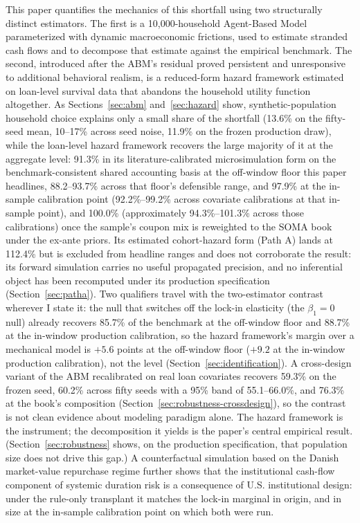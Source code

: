 \documentclass[12pt]{article}
\begin{document}
This paper quantifies the mechanics of this shortfall using two structurally distinct estimators. The first is a 10,000-household Agent-Based Model parameterized with dynamic macroeconomic frictions, used to estimate stranded cash flows and to decompose that estimate against the empirical benchmark. The second, introduced after the ABM's residual proved persistent and unresponsive to additional behavioral realism, is a reduced-form hazard framework estimated on loan-level survival data that abandons the household utility function altogether. As Sections~\ref{sec:abm} and~\ref{sec:hazard} show, synthetic-population household choice explains only a small share of the shortfall (13.6\% on the fifty-seed mean, 10--17\% across seed noise, 11.9\% on the frozen production draw), while the loan-level hazard framework recovers the large majority of it at the aggregate level: 91.3\% in its literature-calibrated microsimulation form on the benchmark-consistent shared accounting basis at the off-window floor this paper headlines, 88.2--93.7\% across that floor's defensible range, and 97.9\% at the in-sample calibration point (92.2\%--99.2\% across covariate calibrations at that in-sample point), and 100.0\% (approximately 94.3\%--101.3\% across those calibrations) once the sample's coupon mix is reweighted to the SOMA book under the ex-ante priors. Its estimated cohort-hazard form (Path A) lands at 112.4\% but is excluded from headline ranges and does not corroborate the result: its forward simulation carries no useful propagated precision, and no inferential object has been recomputed under its production specification (Section~\ref{sec:patha}). Two qualifiers travel with the two-estimator contrast wherever I state it: the null that switches off the lock-in elasticity (the $\beta_1 = 0$ null) already recovers 85.7\% of the benchmark at the off-window floor and 88.7\% at the in-window production calibration, so the hazard framework's margin over a mechanical model is $+5.6$ points at the off-window floor ($+9.2$ at the in-window production calibration), not the level (Section~\ref{sec:identification}). A cross-design variant of the ABM recalibrated on real loan covariates recovers 59.3\% on the frozen seed, 60.2\% across fifty seeds with a 95\% band of 55.1--66.0\%, and 76.3\% at the book's composition (Section~\ref{sec:robustness-crossdesign}), so the contrast is not clean evidence about modeling paradigm alone. The hazard framework is the instrument; the decomposition it yields is the paper's central empirical result. (Section~\ref{sec:robustness} shows, on the production specification, that population size does not drive this gap.) A counterfactual simulation based on the Danish market-value repurchase regime further shows that the institutional cash-flow component of systemic duration risk is a consequence of U.S. institutional design: under the rule-only transplant it matches the lock-in marginal in origin, and in size at the in-sample calibration point on which both were run.
\end{document}
